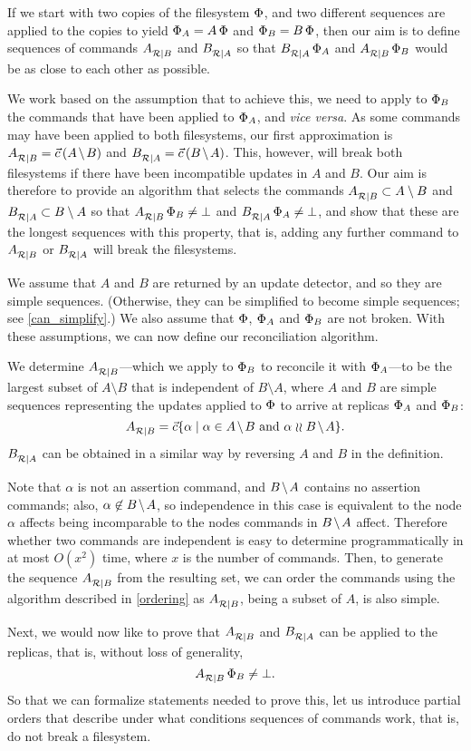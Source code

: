 
If we start with two copies of the filesystem $\Phi$,
and two different sequences are applied to the copies to yield $\Phi_A=A\,\Phi$
and $\Phi_B=B\,\Phi$, then our aim is to define sequences of commands ${A}^{}_{\mathcal{R}|{B}}$ and ${B}^{}_{\mathcal{R}|{A}}$
so that ${B}^{}_{\mathcal{R}|{A}}\,\Phi_A$ and ${A}^{}_{\mathcal{R}|{B}}\,\Phi_B$ would be as close to each other as possible.

We work based on the assumption that to achieve this, we need
to apply to $\Phi_B$ the commands that have been applied to $\Phi_A$, and \emph{vice versa}.
As some commands may have been applied to both filesystems, our first approximation
is $\reca = \amb$ and $\recb = \bma$.
This, however, will break both filesystems if there have been incompatible updates
in $A$ and $B$. 
Our aim is therefore to provide an algorithm that selects the commands 
${A}^{}_{\mathcal{R}|{B}} \subset A\setminus B$
and ${B}^{}_{\mathcal{R}|{A}} \subset B\setminus A$ 
so that ${A}^{}_{\mathcal{R}|{B}}\,\Phi_B\neq\bot$ and ${B}^{}_{\mathcal{R}|{A}}\,\Phi_A\neq\bot$,
and show that these are the longest sequences with this property, that is,
adding any further command to ${A}^{}_{\mathcal{R}|{B}}$ or ${B}^{}_{\mathcal{R}|{A}}$ will break the filesystems.

We assume that $A$ and $B$ are returned by an update detector,
and so they are simple sequences.
(Otherwise, they can be simplified to become simple sequences; see \cref{can_simplify}.)
We also assume that $\Phi$, $\Phi_A$ and $\Phi_B$ are not broken.
With these assumptions,
we can now define our reconciliation algorithm.

\begin{mydef}[Reconciliation]
We determine ${A}^{}_{\mathcal{R}|{B}}$---which we apply to $\Phi_B$ 
to reconcile it with $\Phi_A$---to be
the largest subset of $A\setminus B$
that is independent of $B\setminus A$,
where $A$ and $B$ are simple sequences representing
the updates applied to $\Phi$ to arrive at replicas $\Phi_A$ and $\Phi_B$:
\[ \reca = \ords{\alpha \whr \alpha\in \ambnp  \mbox{~and~}  \alpha\indep \bmanp }. \]
${B}^{}_{\mathcal{R}|{A}}$ can be obtained in a similar way by reversing $A$ and $B$
in the definition.
\end{mydef}

Note that $\alpha$ is not an assertion command, and $\bmanp$ contains no assertion commands;
also, $\alpha\not\in\bmanp$, so independence in this case is equivalent to
the node $\alpha$ affects being incomparable to the nodes commands in $\bmanp$ affect.
Therefore whether two commands are independent is easy to determine programmatically
in at most $O(x^2)$ time, where $x$ is the number of commands. %
Then, to generate the sequence ${A}^{}_{\mathcal{R}|{B}}$ from the resulting set, 
we can order the commands using the algorithm described in
\cref{ordering} as ${A}^{}_{\mathcal{R}|{B}}$, being a subset of $A$, is also simple.


\myskip
Next, we would now like to prove that ${A}^{}_{\mathcal{R}|{B}}$ and ${B}^{}_{\mathcal{R}|{A}}$ can be applied to the replicas,
that is, without loss of generality,
\[ {A}^{}_{\mathcal{R}|{B}}\,\Phi_B\neq\bot. \]
So that we can formalize statements needed to prove this,
let us introduce partial orders that describe under what conditions
sequences of commands work, that is, do not break a filesystem.
